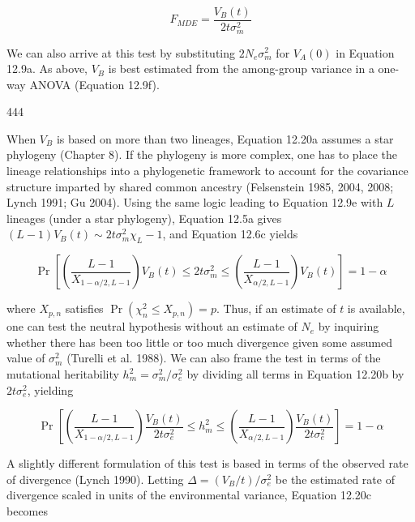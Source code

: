 \documentclass{article}
\begin{document}
\begin{equation}
F_{MDE}=\frac{V_{B}(t)}{2t\sigma_{m}^{2}}
\tag{12.20a}
\label{eq:12_20a}
\end{equation}

We can also arrive at this test by substituting  $ 2N_e\sigma_m^2 $ for  $ V_A(0) $ in Equation 12.9a. As above,  $ V_B $ is best estimated from the among-group variance in a one-way ANOVA (Equation 12.9f).

444

When  $ V_B $ is based on more than two lineages, Equation 12.20a assumes a star phylogeny (Chapter 8). If the phylogeny is more complex, one has to place the lineage relationships into a phylogenetic framework to account for the covariance structure imparted by shared common ancestry (Felsenstein 1985, 2004, 2008; Lynch 1991; Gu 2004). Using the same logic leading to Equation 12.9e with  $ L $ lineages (under a star phylogeny), Equation 12.5a gives  $ (L - 1)V_B(t) \sim 2t\sigma_m^2\chi_L-1 $, and Equation 12.6c yields

\begin{equation}
\Pr\left[\left(\frac{L-1}{X_{1-\alpha/2,L-1}}\right)V_{B}(t)\leq2t\sigma_{m}^{2}\leq\left(\frac{L-1}{X_{\alpha/2,L-1}}\right)V_{B}(t)\right]=1-\alpha
\tag{12.20b}
\label{eq:12_20b}
\end{equation}

where  $ X_{p,n} $ satisfies  $ \Pr(\chi_n^2 \leq X_{p,n}) = p $. Thus, if an estimate of  $ t $ is available, one can test the neutral hypothesis without an estimate of  $ N_e $ by inquiring whether there has been too little or too much divergence given some assumed value of  $ \sigma_m^2 $ (Turelli et al. 1988). We can also frame the test in terms of the mutational heritability  $ h_m^2 = \sigma_m^2 / \sigma_e^2 $ by dividing all terms in Equation 12.20b by  $ 2t\sigma_e^2 $, yielding

\begin{equation}
\Pr\left[\left(\frac{L-1}{X_{1-\alpha/2,L-1}}\right)\frac{V_{B}(t)}{2t\sigma_{e}^{2}}\leq h_{m}^{2}\leq\left(\frac{L-1}{X_{\alpha/2,L-1}}\right)\frac{V_{B}(t)}{2t\sigma_{e}^{2}}\right]=1-\alpha
\tag{12.20c}
\label{eq:12_20c}
\end{equation}

A slightly different formulation of this test is based in terms of the observed rate of divergence (Lynch 1990). Letting  $ \Delta = (V_B/t)/\sigma_e^2 $ be the estimated rate of divergence scaled in units of the environmental variance, Equation 12.20c becomes
\end{document}
